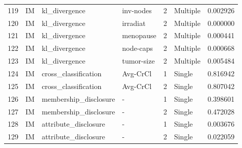 \begin{tabular}{llllrlr}
119 &       IM &          kl\_divergence &    inv-nodes &    2 &  Multiple &  0.002926 \\
120 &       IM &          kl\_divergence &     irradiat &    2 &  Multiple &  0.000000 \\
121 &       IM &          kl\_divergence &    menopause &    2 &  Multiple &  0.000441 \\
122 &       IM &          kl\_divergence &    node-caps &    2 &  Multiple &  0.000668 \\
123 &       IM &          kl\_divergence &   tumor-size &    2 &  Multiple &  0.005484 \\
124 &       IM &   cross\_classification &     Avg-CrCl &    1 &    Single &  0.816942 \\
125 &       IM &   cross\_classification &     Avg-CrCl &    2 &    Single &  0.807042 \\
126 &       IM &  membership\_disclosure &            - &    1 &    Single &  0.398601 \\
127 &       IM &  membership\_disclosure &            - &    2 &    Single &  0.472028 \\
128 &       IM &   attribute\_disclosure &            - &    1 &    Single &  0.003676 \\
129 &       IM &   attribute\_disclosure &            - &    2 &    Single &  0.022059 \\
\bottomrule
\end{tabular}
